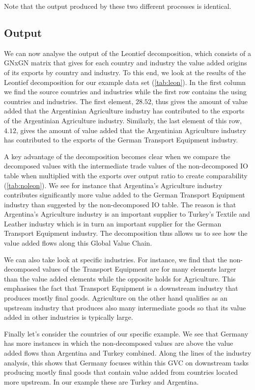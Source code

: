 \documentclass[a4paper]{article}\usepackage[]{graphicx}\usepackage[]{color}
\begin{document}
Note that the output produced by these two different processes is identical.

\subsection{Output}
We can now analyse the output of the Leontief decomposition, which consists of a GNxGN matrix that gives for each country and industry the
value added origins of its exports by country and industry.
To this end, we look at the results of the Leontief decomposition for our example data set (\cref{tab:leon}).
In the first column we find the source countries and industries while the first row contains the using countries and industries.
The first element, $28.52$, thus gives the amount of value added that the Argentinian Agriculture industry has contributed to the exports of the Argentinian Agriculture industry.
Similarly, the last element of this row, $4.12$, gives the amount of value added that the Argentinian Agriculture industry has contributed to the exports of the German Transport Equipment industry.

A key advantage of the decomposition becomes clear when we compare the decomposed values with the intermediate trade
values of the non-decomposed IO table when multiplied with the exports over output ratio to create
comparability (\cref{tab:noleon}).
We see for instance that Argentina's Agriculture industry contributes significantly more value added to the German Transport Equipment industry than suggested by the non-decomposed IO table.
The reason is that Argentina's Agriculture industry is an important supplier to Turkey's Textile and Leather industry which is in turn an important supplier for the German Transport Equipment industry.
The decomposition thus allows us to see how the value added flows along this Global Value Chain.

We can also take look at specific industries.
For instance, we find that the non-decomposed values of the Transport Equipment are for many elements larger than the value added elements while the opposite holds for Agriculture.
This emphasises the fact that Transport Equipment is a downstream industry that produces mostly final goods.
Agriculture on the other hand qualifies as an upstream industry that produces also many intermediate goods so that its value added in other industries is typically large.

Finally let's consider the countries of our specific example.
We see that Germany has more instances in which the non-decomposed values are above the value added flows than Argentina and Turkey combined.
Along the lines of the industry analysis, this shows that Germany focuses within this GVC on downstream tasks producing mostly final goods that contain value added from countries located more upstream.
In our example these are Turkey and Argentina.
\end{document}
